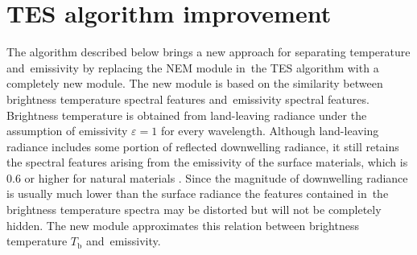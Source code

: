 \section{TES algorithm improvement}

The algorithm described below brings a new approach for separating temperature and~emissivity by replacing the NEM module in~the TES algorithm with a completely new module. The new module is based on the similarity between brightness temperature spectral features and~emissivity spectral features. Brightness temperature is obtained from land-leaving radiance under the assumption of emissivity $\varepsilon=1$ for every wavelength. Although land-leaving radiance includes some portion of reflected downwelling radiance, it still retains the spectral features arising from the emissivity of the surface materials, which is $0.6$ or higher for natural materials \cite{GR98}. Since the magnitude of downwelling radiance is usually much lower than the surface radiance the features contained in~the brightness temperature spectra may be distorted but will not be completely hidden. The new module approximates this relation between brightness temperature $T_\mathrm{b}$ and~emissivity.

